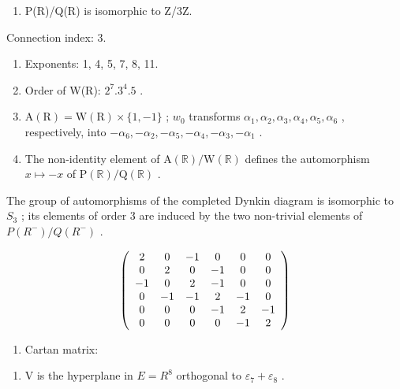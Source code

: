 \begin{enumerate}
\def\labelenumi{(\Roman{enumi})}
\setcounter{enumi}{7}
\tightlist
\item
  P(R)/Q(R) is isomorphic to Z/3Z.
\end{enumerate}

Connection index: 3.

\begin{enumerate}
\def\labelenumi{(\Roman{enumi})}
\setcounter{enumi}{8}
\item
  Exponents: 1, 4, 5, 7, 8, 11.
\item
  Order of W(R): \(2^{7}.3^{4}.5\) .
\item
  \(\mathrm{A}(\mathrm{R}) = \mathrm{W}(\mathrm{R}) \times \{1, -1\}\) ; \(w_0\) transforms \(\alpha_1, \alpha_2, \alpha_3, \alpha_4, \alpha_5, \alpha_6\) , respectively, into \(-\alpha_6, -\alpha_2, -\alpha_5, -\alpha_4, -\alpha_3, -\alpha_1\) .
\item
  The non-identity element of \(\mathrm{A}(\mathbb{R}) / \mathrm{W}(\mathbb{R})\) defines the automorphism \(x \mapsto -x\) of \(\mathrm{P}(\mathbb{R}) / \mathrm{Q}(\mathbb{R})\) .
\end{enumerate}

The group of automorphisms of the completed Dynkin diagram is isomorphic to \(S_{3}\) ; its elements of order 3 are induced by the two non-trivial elements of \(P(R^{-})/Q(R^{-})\) .

\[
\left( \begin{array}{c c c c c c} 2 & 0 & - 1 & 0 & 0 & 0 \\ 0 & 2 & 0 & - 1 & 0 & 0 \\ - 1 & 0 & 2 & - 1 & 0 & 0 \\ 0 & - 1 & - 1 & 2 & - 1 & 0 \\ 0 & 0 & 0 & - 1 & 2 & - 1 \\ 0 & 0 & 0 & 0 & - 1 & 2 \end{array} \right)
\]

\begin{enumerate}
\def\labelenumi{(\Roman{enumi})}
\setcounter{enumi}{12}
\tightlist
\item
  Cartan matrix:
\end{enumerate}


\begin{enumerate}
\def\labelenumi{(\Roman{enumi})}
\tightlist
\item
  V is the hyperplane in \(E = R^{8}\) orthogonal to \(\varepsilon_{7} + \varepsilon_{8}\) .
\end{enumerate}

